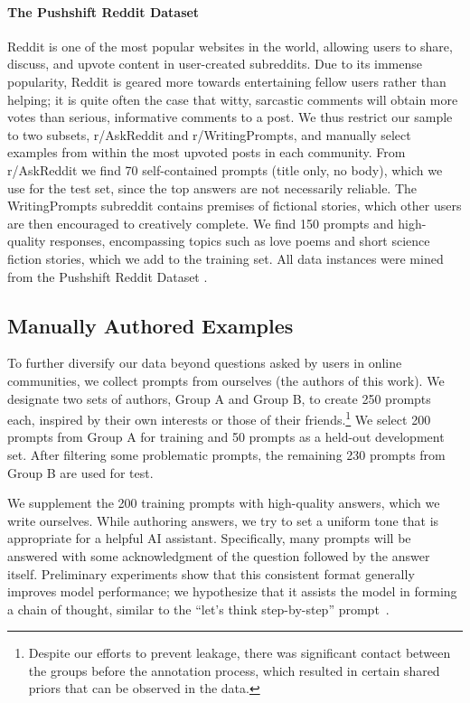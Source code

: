 \documentclass{article}
\begin{document}
\paragraph{The Pushshift Reddit Dataset}
Reddit is one of the most popular websites in the world, allowing users to share, discuss, and upvote content in user-created subreddits.
Due to its immense popularity, Reddit is geared more towards entertaining fellow users rather than helping; it is quite often the case that witty, sarcastic comments will obtain more votes than serious, informative comments to a post.
We thus restrict our sample to two subsets, r/AskReddit and r/WritingPrompts, and manually select examples from within the most upvoted posts in each community.
From r/AskReddit we find 70 self-contained prompts (title only, no body), which we use for the test set, since the top answers are not necessarily reliable.
The WritingPrompts subreddit contains premises of fictional stories, which other users are then encouraged to creatively complete.
We find 150 prompts and high-quality responses, encompassing topics such as love poems and short science fiction stories, which we add to the training set.
All data instances were mined from the Pushshift Reddit Dataset \citep{baumgartner2020pushshift}.

\subsection{Manually Authored Examples}
\label{sec:manual_data}

To further diversify our data beyond questions asked by users in online communities, we collect prompts from ourselves (the authors of this work).
We designate two sets of authors, Group A and Group B, to create 250 prompts each, inspired by their own interests or those of their friends.\footnote{Despite our efforts to prevent leakage, there was significant contact between the groups before the annotation process, which resulted in certain shared priors that can be observed in the data.}
We select 200 prompts from Group A for training and 50 prompts as a held-out development set.
After filtering some problematic prompts, the remaining 230 prompts from Group B are used for test.

We supplement the 200 training prompts with high-quality answers, which we write ourselves.
While authoring answers, we try to set a uniform tone that is appropriate for a helpful AI assistant.
Specifically, many prompts will be answered with some acknowledgment of the question followed by the answer itself.
Preliminary experiments show that this consistent format generally improves model performance; we hypothesize that it assists the model in forming a chain of thought, similar to the ``let's think step-by-step'' prompt~\citep{kojima2022large,weichain}.
\end{document}
